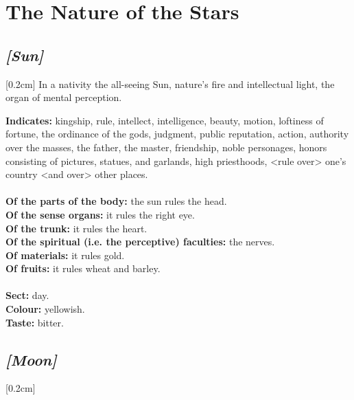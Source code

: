 
\section{The Nature of the Stars}

\subsection{\textit{[Sun]}}
[0.2cm]
In a nativity the all-seeing 
Sun, nature’s fire and intellectual light, the organ of mental perception.

\textbf{Indicates:} kingship, rule, intellect, intelligence, beauty, motion, loftiness of fortune, the ordinance of the gods, judgment, public reputation, action, authority over the masses, the father, the master, friendship, noble personages, honors consisting of pictures, statues, and garlands, high priesthoods, <rule over> one’s country <and over> other places. \\
\\
\textbf{Of the parts of the body:} the sun rules the head. \\
\textbf{Of the sense organs:} it rules the right eye. \\
\textbf{Of the trunk:} it rules the heart.\\
\textbf{Of the spiritual (i.e. the perceptive) faculties:} the nerves.\\
\textbf{Of materials:} it rules gold. \\
\textbf{Of fruits:} it rules wheat and barley. \\
\\
\textbf{Sect:} day. \\
\textbf{Colour:} yellowish. \\
\textbf{Taste:} bitter.
\secbr
\subsection{\textit{[Moon]}}
[0.2cm]

